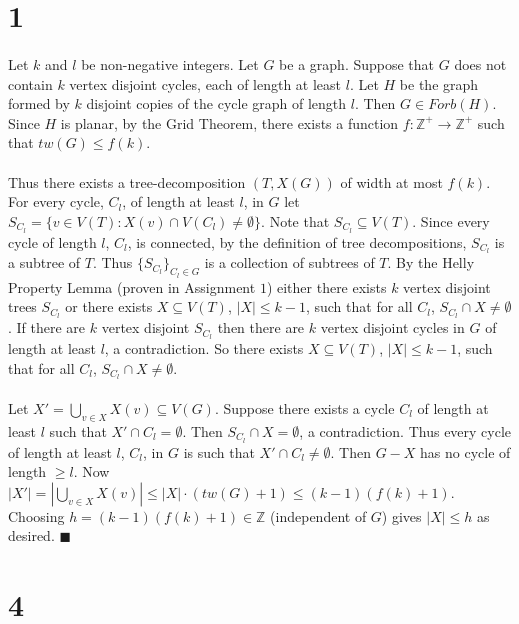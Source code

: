 \documentclass[letterpaper,12pt,oneside,onecolumn]{report}
\begin{document}
\section*{1}
\paragraph{}
Let $k$ and $l$ be non-negative integers. Let $G$ be a graph. Suppose that $G$ does not contain $k$ vertex disjoint cycles, each of length at least $l$. Let $H$ be the graph formed by $k$ disjoint copies of the cycle graph of length $l$. Then $G \in Forb(H)$. Since $H$ is planar, by the Grid Theorem, there exists a function $f: \mathbb{Z}^+ \rightarrow \mathbb{Z}^+$ such that $tw(G) \leq f(k)$.
\paragraph{}
Thus there exists a tree-decomposition $(T, X(G))$ of width at most $f(k)$. For every cycle, $C_l$, of length at least $l$,  in $G$ let $S_{C_l} = \{ v \in V(T) : X(v) \cap V(C_l) \neq \emptyset \}$. Note that $S_{C_l} \subseteq V(T)$. Since every cycle of length $l$, $C_l$, is connected, by the definition of tree decompositions, $S_{C_l}$ is a subtree of $T$. Thus $\{S_{C_l}\}_{C_l \in G}$ is a collection of subtrees of $T$. By the Helly Property Lemma (proven in Assignment $1$) either there exists $k$ vertex disjoint trees $S_{C_l}$ or there exists $X \subseteq V(T)$, $|X| \leq k-1$, such that for all $C_l$, $S_{C_l} \cap X \neq \emptyset$. If there are $k$ vertex disjoint $S_{C_l}$ then there are $k$ vertex disjoint cycles in $G$ of length at least $l$, a contradiction. So there exists $X \subseteq V(T)$, $|X| \leq k-1$, such that for all $C_l$, $S_{C_l}\cap X \neq \emptyset$.
\paragraph{}
Let $X' = \bigcup_{v\in X} X(v) \subseteq V(G)$. Suppose there exists a cycle $C_l$ of length at least $l$ such that $X' \cap C_l = \emptyset$. Then $S_{C_l} \cap X = \emptyset$, a contradiction. Thus every cycle of length at least $l$, $C_l$, in $G$ is such that $X' \cap C_l \neq \emptyset.$ Then $G-X$ has no cycle of length $\geq l$. Now $|X'| = |\bigcup_{v\in X} X(v)| \leq |X|\cdot (tw(G) + 1) \leq (k-1)(f(k) + 1)$.  Choosing $h = (k-1)(f(k) + 1) \in \mathbb{Z}$ (independent of $G$) gives $|X| \leq h$ as desired. $\blacksquare$ 

\section*{4}
\end{document}
